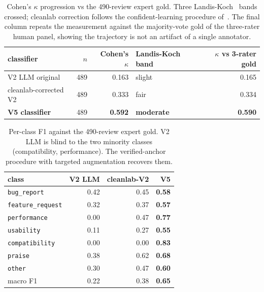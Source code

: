 \documentclass[preprint,12pt]{elsarticle}
\begin{document}
\begin{table}[!htbp]\centering\footnotesize
  \caption{Cohen's $\kappa$ progression vs the 490-review expert gold. Three
  Landis-Koch~\cite{landis1977measurement} bands crossed; cleanlab correction follows the
  confident-learning procedure of~\cite{northcutt2021confident}. The final column repeats the
  measurement against the majority-vote gold of the three-rater human panel, showing the
  trajectory is not an artifact of a single annotator.}\label{tab:kappa}
  \begin{tabular}{lrrlr}\toprule
  classifier & $n$ & Cohen's $\kappa$ & Landis-Koch band & $\kappa$ vs 3-rater gold \\\midrule
  V2 LLM original & 489 & 0.163 & slight & 0.165 \\
  cleanlab-corrected V2 & 489 & 0.333 & fair & 0.334 \\
  \textbf{V5 classifier} & 489 & \textbf{0.592} & \textbf{moderate} & \textbf{0.590} \\
  \bottomrule\end{tabular}\end{table}

\begin{table}[!htbp]\centering\footnotesize
  \caption{Per-class F1 against the 490-review expert gold. V2 LLM is blind to the two minority
  classes (compatibility, performance). The verified-anchor procedure with targeted augmentation
  recovers them.}\label{tab:perclass-f1}
  \begin{tabular}{lrrr}\toprule
  class & V2 LLM & cleanlab-V2 & \textbf{V5} \\\midrule
  \texttt{bug\_report} & 0.42 & 0.45 & \textbf{0.58} \\
  \texttt{feature\_request} & 0.32 & 0.37 & \textbf{0.57} \\
  \texttt{performance} & 0.00 & 0.47 & \textbf{0.77} \\
  \texttt{usability} & 0.11 & 0.27 & \textbf{0.55} \\
  \texttt{compatibility} & 0.00 & 0.00 & \textbf{0.83} \\
  \texttt{praise} & 0.38 & 0.62 & \textbf{0.68} \\
  \texttt{other} & 0.30 & 0.47 & \textbf{0.60} \\\midrule
  macro F1 & 0.22 & 0.38 & \textbf{0.65} \\
  \bottomrule\end{tabular}\end{table}
\end{document}
